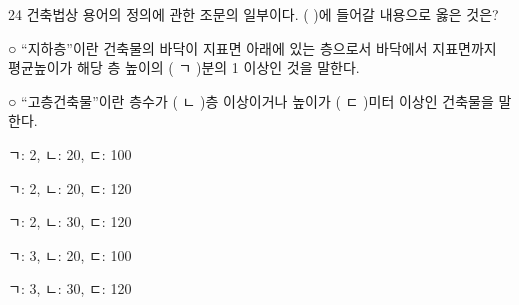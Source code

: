\begin{question}{24}
건축법상 용어의 정의에 관한 조문의 일부이다. ( )에 들어갈 내용으로 옳은 것은?
\begin{framedtext}
○ “지하층”이란 건축물의 바닥이 지표면 아래에 있는 층으로서 바닥에서 지표면까지 평균높이가 해당 층 높이의 ( ㄱ )분의 1 이상인 것을 말한다. \par
○ “고층건축물”이란 층수가 ( ㄴ )층 이상이거나 높이가 ( ㄷ )미터 이상인 건축물을 말한다. \par
\end{framedtext}
\begin{choices}
  \item ㄱ: 2, ㄴ: 20, ㄷ: 100
  \item ㄱ: 2, ㄴ: 20, ㄷ: 120
  \item ㄱ: 2, ㄴ: 30, ㄷ: 120
  \item ㄱ: 3, ㄴ: 20, ㄷ: 100
  \item ㄱ: 3, ㄴ: 30, ㄷ: 120
\end{choices}
\end{question}
